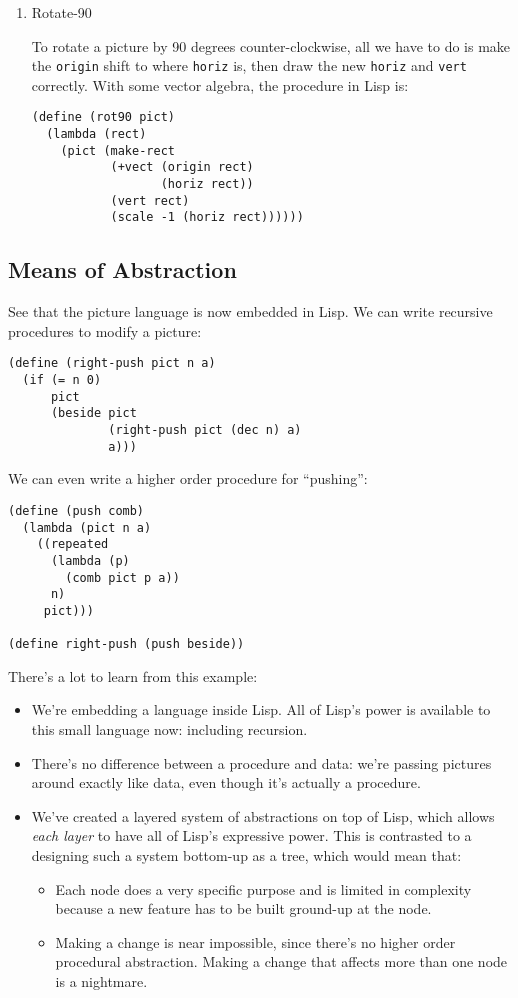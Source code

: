 \documentclass[9pt]{report}
\begin{document}
\begin{enumerate}
\item Rotate-90
\label{sec:org408768e}

To rotate a picture by 90 degrees counter-clockwise, all we have
to do is make the \texttt{origin} shift to where \texttt{horiz} is, then draw
the new \texttt{horiz} and \texttt{vert} correctly. With some vector algebra,
the procedure in Lisp is:

\begin{verbatim}
(define (rot90 pict)
  (lambda (rect)
    (pict (make-rect
           (+vect (origin rect)
                  (horiz rect))
           (vert rect)
           (scale -1 (horiz rect))))))
\end{verbatim}
\end{enumerate}


\subsection{Means of Abstraction}
\label{sec:org5f43f9c}
See that the picture language is now embedded in Lisp. We can
write recursive procedures to modify a picture:

\begin{verbatim}
(define (right-push pict n a)
  (if (= n 0)
      pict
      (beside pict
              (right-push pict (dec n) a)
              a)))
\end{verbatim}

We can even write a higher order procedure for ``pushing'':
\begin{verbatim}
(define (push comb)
  (lambda (pict n a)
    ((repeated
      (lambda (p)
        (comb pict p a))
      n)
     pict)))

(define right-push (push beside))
\end{verbatim}

There's a lot to learn from this example:
\begin{itemize}
\item We're embedding a language inside Lisp. All of Lisp's power is
available to this small language now: including recursion.
\item There's no difference between a procedure and data: we're
passing pictures around exactly like data, even though it's
actually a procedure.
\item We've created a layered system of abstractions on top of Lisp,
which allows \emph{each layer} to have all of Lisp's expressive
power. This is contrasted to a designing such a system bottom-up
as a tree, which would mean that:
\begin{itemize}
\item Each node does a very specific purpose and is limited in
complexity because a new feature has to be built ground-up at
the node.
\item Making a change is near impossible, since there's no higher
order procedural abstraction. Making a change that affects
more than one node is a nightmare.
\end{itemize}
\end{itemize}
\end{document}
